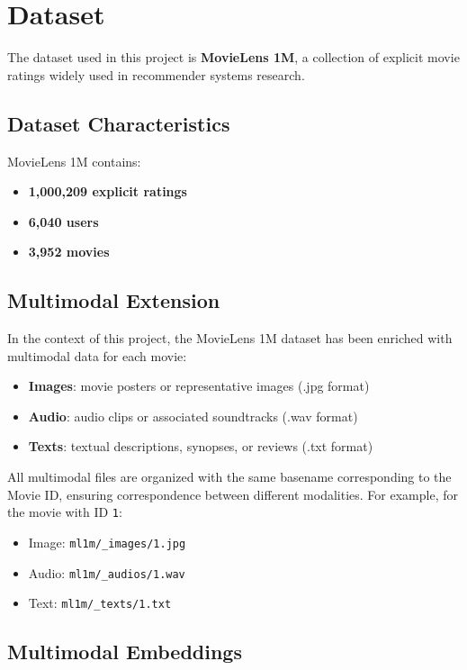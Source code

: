 \section{Dataset}

The dataset used in this project is \textbf{MovieLens 1M}, a collection of explicit movie ratings widely used in recommender systems research.

\subsection{Dataset Characteristics}

MovieLens 1M contains:
\begin{itemize}
    \item \textbf{1,000,209 explicit ratings}
    \item \textbf{6,040 users}
    \item \textbf{3,952 movies} 
\end{itemize}


\subsection{Multimodal Extension}

In the context of this project, the MovieLens 1M dataset has been enriched with multimodal data for each movie:

\begin{itemize}
    \item \textbf{Images}: movie posters or representative images (.jpg format)
    \item \textbf{Audio}: audio clips or associated soundtracks (.wav format)
    \item \textbf{Texts}: textual descriptions, synopses, or reviews (.txt format)
\end{itemize}

All multimodal files are organized with the same basename corresponding to the Movie ID, ensuring correspondence between different modalities. For example, for the movie with ID \texttt{1}:
\begin{itemize}
    \item Image: \texttt{ml1m/\_images/1.jpg}
    \item Audio: \texttt{ml1m/\_audios/1.wav}
    \item Text: \texttt{ml1m/\_texts/1.txt}
\end{itemize}

\subsection{Multimodal Embeddings}

